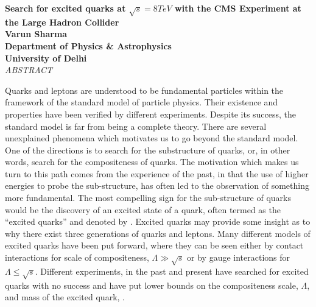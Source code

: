\begin{center}

{\large \textbf{Search for excited quarks at $\sqrt{s}=8\unit{TeV}$ with the CMS Experiment at the Large Hadron Collider}} \\
%
\vspace{0.5cm}
%
{\large \textbf{Varun Sharma}} \\
%
{\large \textbf{Department of Physics \& Astrophysics \\ University of Delhi}} \\
%
\vspace{0.4cm}
%
{\large \emph{ABSTRACT}}
\end{center}
Quarks and leptons are understood to be fundamental particles within the framework of the standard model of particle physics. Their existence and
properties have been verified by different experiments. Despite its success, the standard model is far from being a complete theory. There are several 
unexplained phenomena which motivates us to go beyond the standard model. One of the directions is to search for the substructure of quarks, or, in other 
words, search for the compositeness of quarks. The motivation which makes us turn to this path comes from the experience of the past, in that the use of 
higher energies to probe the sub-structure, has often led to the observation of something more fundamental. The most compelling sign for the sub-structure 
of quarks would be the discovery of an excited state of a quark, often termed as the ``excited quarks'' and denoted by \qstar. Excited quarks may provide 
some insight as to why there exist three generations of quarks and leptons. Many different models of excited quarks have been put forward, where they 
can be seen either by contact interactions for scale of compositeness, $\Lambda\gg\sqrt{s}$ or by gauge interactions for $\Lambda\le\sqrt{s}$. 
Different experiments, in the past and present have searched for excited quarks with no success and have put lower bounds on the compositeness 
scale, $\Lambda$, and mass of the excited quark, \mqstar. 

